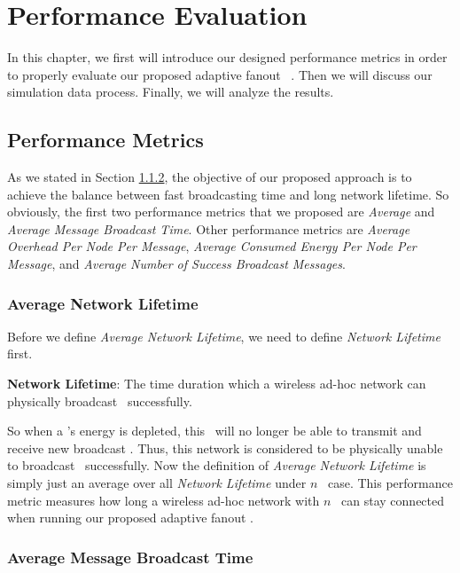 \chapter{Performance Evaluation}
\label{Chapter5}

In this chapter, we first will introduce our designed performance metrics in order to properly evaluate our proposed adaptive fanout \pp ~\gp. Then we will discuss our simulation data process. Finally, we will analyze the results.

\section{Performance Metrics}
As we stated in Section \ref{}, the objective of our proposed approach is to achieve the balance between fast broadcasting time and long network lifetime. So obviously, the first two performance metrics that we proposed are \emph{Average \nl} and \emph{Average Message Broadcast Time}. Other performance metrics are \emph{Average Overhead Per Node Per Message}, \emph{Average Consumed Energy Per Node Per Message}, and \emph{Average Number of Success Broadcast Messages}.

\subsection{Average Network Lifetime}

Before we define \emph{Average Network Lifetime}, we need to define \emph{Network Lifetime} first. 

\textbf{Network Lifetime}: The time duration which a wireless ad-hoc network can physically broadcast \msgs ~successfully.

So when a \gn's energy is depleted, this \gn ~will no longer be able to transmit and receive new broadcast \msgs. Thus, this network is considered to be physically unable to broadcast \msgs ~successfully. Now the definition of \emph{Average Network Lifetime} is simply just an average over all \emph{Network Lifetime} under $n$ \gns ~case. This performance metric measures how long a wireless ad-hoc network with $n$ \gns ~can stay connected when running our proposed adaptive fanout \gp.

\subsection{Average Message Broadcast Time}

